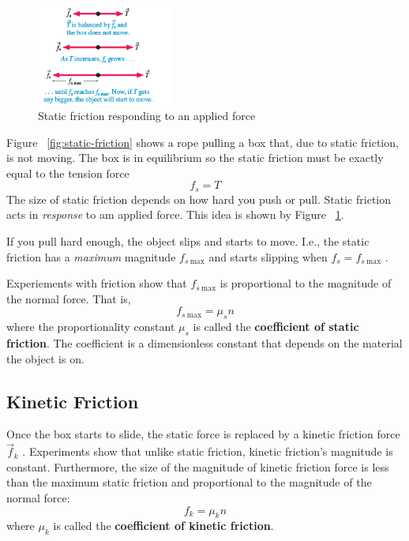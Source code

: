 \begin{figure}
    \centering
    \includegraphics[width=0.4\textwidth]{../figures/static-friction-response.png}
    \caption{Static friction responding to an applied force}%
    \label{fig:static-friction-response}
\end{figure}
Figure~%
\ref{fig:static-friction} shows a rope pulling a box that, due to static
friction, is not moving.  The box is in equilibrium so the static
friction must be exactly equal to the tension force
\begin{equation}
    f_s=T
\end{equation}
The size of static friction depends on how hard you push or pull.
Static friction acts in \emph{response} to am applied force.  This idea
is shown by Figure~%
\ref{fig:static-friction-response}.

If you pull hard enough, the object slips and starts to move.  I.e., the
static friction has a \emph{maximum} magnitude
$
    f_{s~\mathrm{max}}
$ and starts slipping when
$
    f_s=f_{s\mathrm{~max}}
$%
.

Experiements with friction show that
$
    f_{s~\mathrm{max}}
$ is proportional to the magnitude of the normal force.  That is,
\begin{equation}
    f_{s~\mathrm{max}}=\mu_sn
\end{equation}
where the proportionality constant
$
    \mu_s
$ is called the \textbf{coefficient of static friction}.  The
coefficient is a dimensionless constant that depends on the material the
object is on.

\subsection{Kinetic Friction}

Once the box starts to slide, the static force is replaced by a kinetic
friction force
$
    \vec{f}_k
$%
.  Experiments show that unlike static friction, kinetic friction's
magnitude is constant.  Furthermore, the size of the magnitude of
kinetic friction force is less than the maximum static friction and
proportional to the magnitude of the normal force:
\begin{equation}
    f_k=\mu_kn
\end{equation}
where
$
    \mu_k
$ is called the \textbf{coefficient of kinetic friction}.
